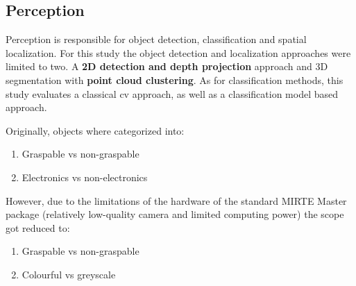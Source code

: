 \subsection*{Perception}

Perception is responsible for object detection, classification and spatial localization. For this study the object detection and localization approaches were limited to two. A \textbf{2D detection and depth projection} approach and 3D segmentation with \textbf{point cloud clustering}.
As for classification methods, this study evaluates a classical cv approach, as well as a classification model based approach.

Originally, objects where categorized into:

\begin{enumerate}
\item Graspable vs non-graspable
\item Electronics vs non-electronics
\end{enumerate}

However, due to the limitations of the hardware of the standard MIRTE Master package (relatively low-quality camera and limited computing power) the scope got reduced to:

\begin{enumerate}
\item Graspable vs non-graspable
\item Colourful vs greyscale
\end{enumerate}